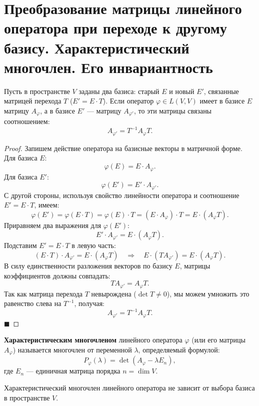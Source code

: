 \section{Преобразование матрицы линейного оператора при переходе к другому базису. Характеристический многочлен. Его инвариантность}

\begin{theorem}
Пусть в пространстве $V$ заданы два базиса: старый $E$ и новый $E'$, связанные матрицей перехода $T$ ($E' = E \cdot T$). Если оператор $\varphi \in L(V, V)$ имеет в базисе $E$ матрицу $A_\varphi$, а в базисе $E'$ --- матрицу $A_{\varphi'}$, то эти матрицы связаны соотношением:
\[
A_{\varphi'} = T^{-1} A_\varphi T.
\]
\end{theorem}

\begin{proof}
Запишем действие оператора на базисные векторы в матричной форме. Для базиса $E$:
\[
\varphi(E) = E \cdot A_\varphi.
\]
Для базиса $E'$:
\[
\varphi(E') = E' \cdot A_{\varphi'}.
\]
С другой стороны, используя свойство линейности оператора и соотношение $E' = E \cdot T$, имеем:
\[
\varphi(E') = \varphi(E \cdot T) = \varphi(E) \cdot T = (E \cdot A_\varphi) \cdot T = E \cdot (A_\varphi T).
\]
Приравняем два выражения для $\varphi(E')$:
\[
E' \cdot A_{\varphi'} = E \cdot (A_\varphi T).
\]
Подставим $E' = E \cdot T$ в левую часть:
\[
(E \cdot T) \cdot A_{\varphi'} = E \cdot (A_\varphi T) \quad \Rightarrow \quad E \cdot (T A_{\varphi'}) = E \cdot (A_\varphi T).
\]
В силу единственности разложения векторов по базису $E$, матрицы коэффициентов должны совпадать:
\[
T A_{\varphi'} = A_\varphi T.
\]
Так как матрица перехода $T$ невырождена ($\det T \neq 0$), мы можем умножить это равенство слева на $T^{-1}$, получая:
\[
A_{\varphi'} = T^{-1} A_\varphi T.
\]
\hfill$\blacksquare$
\end{proof}

\begin{definition}
\textbf{Характеристическим многочленом} линейного оператора $\varphi$ (или его матрицы $A_\varphi$) называется многочлен от переменной $\lambda$, определяемый формулой:
\[
P_\varphi(\lambda) = \det(A_\varphi - \lambda E_n),
\]
где $E_n$ --- единичная матрица порядка $n = \dim V$.
\end{definition}

\begin{theorem}
Характеристический многочлен линейного оператора не зависит от выбора базиса в пространстве $V$.
\end{theorem}


